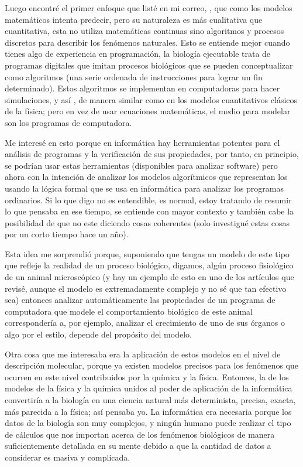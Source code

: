 \documentclass[12pt]{article}
\begin{document}
	Luego encontré el primer enfoque que listé en mi correo,
	, que como los modelos matemáticos
	intenta predecir, pero su naturaleza es más cualitativa que
	cuantitativa, esta no utiliza matemáticas continuas sino algoritmos y
	procesos discretos para describir los fenómenos naturales. Esto se
	entiende mejor cuando tienes algo de experiencia en programación, la
	biología ejecutable trata de programas digitales que imitan procesos
	biológicos que se pueden conceptualizar como algoritmos (una serie
	ordenada de instrucciones para lograr un fin determinado). Estos
	algoritmos se implementan en computadoras para hacer simulaciones, y así
	, de manera similar como en los modelos
	cuantitativos clásicos de la física; pero en vez de usar ecuaciones
	matemáticas, el medio para modelar son los programas de computadora.

	Me interesé en esto porque en informática hay herramientas
	potentes para el análisis de programas y la verificación de sus
	propiedades, por tanto, en principio, se podrían usar estas herramientas
	(disponibles para analizar software) pero ahora con la intención de
	analizar los modelos algorítmicos que representan los
	 usando la lógica formal que se
	usa en informática para analizar los programas ordinarios. Si lo que
	digo no es entendible, es normal, estoy tratando de resumir lo que
	pensaba en ese tiempo, se entiende con mayor contexto y también cabe la
	posibilidad de que no este diciendo cosas coherentes (solo investigué
	estas cosas por un corto tiempo hace un año).

	Esta idea me sorprendió porque, suponiendo que tengas un modelo de este
	tipo que refleje la realidad de un proceso biológico, digamos, algún
	proceso fisiológico de un animal microscópico (y hay un ejemplo de esto
	en uno de los artículos que revisé, aunque el modelo es extremadamente
	complejo y no sé que tan efectivo sea) entonces analizar automáticamente
	las propiedades de un programa de computadora que modele el
	comportamiento biológico de este animal correspondería a, por
	ejemplo, analizar el crecimiento de uno de sus órganos o algo por el
	estilo, depende del propósito del modelo.

	Otra cosa que me interesaba era la aplicación de estos modelos en el
	nivel de descripción molecular, porque ya existen modelos precisos para
	los fenómenos que ocurren en este nivel contribuidos por la química y la
	física. Entonces, la  de los modelos de la física y la
	química unidos al poder de aplicación de la informática convertiría a
	la biología en una ciencia natural más determinista, precisa, exacta,
	más parecida a la física; así pensaba yo. La informática era necesaria
	porque los datos de la biología son muy complejos, y ningún humano puede
	realizar el tipo de cálculos que nos importan acerca de los fenómenos
	biológicos de manera suficientemente detallada en su mente debido a que
	la cantidad de datos a considerar es masiva y complicada.
\end{document}
